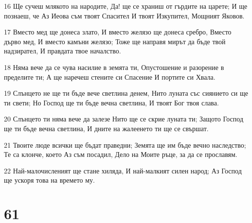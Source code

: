 \par 16 Ще сучеш млякото на народите, Да! ще се храниш от гърдите на царете; И ще познаеш, че Аз Иеова съм твоят Спасител И твоят Изкупител, Мощният Яковов.
\par 17 Вместо мед ще донеса злато, И вместо желязо ще донеса сребро, Вместо дърво мед, И вместо камъни желязо; Тоже ще направя мирът да бъде твой надзирател, И правдата твое началство.
\par 18 Няма вече да се чува насилие в земята ти, Опустошение и разорение в пределите ти; А ще наречеш стените си Спасение И портите си Хвала.
\par 19 Слънцето не ще ти бъде вече светлина денем, Нито луната със сиянието си ще ти свети; Но Господ ще ти бъде вечна светлина, И твоят Бог твоя слава.
\par 20 Слънцето ти няма вече да залезе Нито ще се скрие луната ти; Защото Господ ще ти бъде вечна светлина, И дните на жалеенето ти ще се свършат.
\par 21 Твоите люде всички ще бъдат праведни; Земята ще им бъде вечно наследство; Те са клонче, което Аз съм посадил, Дело на Моите ръце, за да се прославям.
\par 22 Най-малочисленият ще стане хиляда, И най-малкият силен народ; Аз Господ ще ускоря това на времето му.

\chapter{61}

